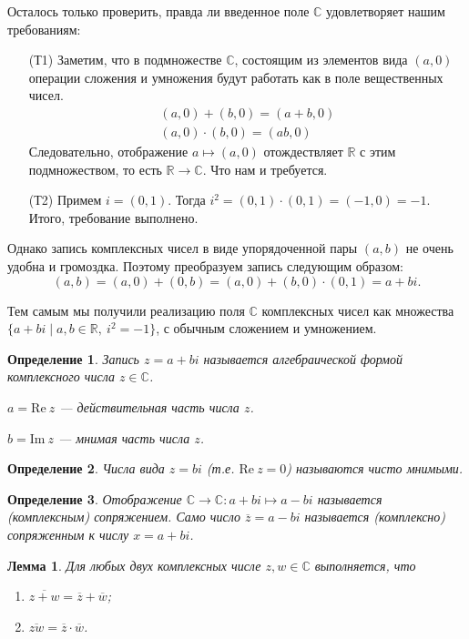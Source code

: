 \documentclass[a4paper,12pt]{article}
\newtheorem*{Def}{Определение}
\newtheorem*{Lemma}{Лемма}
\renewcommand{\Re}{\mathrm{Re\:}}
\renewcommand{\Im}{\mathrm{Im\:}}
\begin{document}
Осталось только проверить, правда ли введенное поле $\mathbb{C}$ удовлетворяет нашим требованиям:
\begin{itemize}
\item[(Т1)] Заметим, что в подмножестве $\mathbb{C}$, состоящим из элементов вида $(a, 0)$ операции сложения и умножения будут работать как в поле вещественных чисел.
\begin{gather*}
(a, 0) + (b, 0) = (a + b, 0) \\
(a, 0) \cdot (b, 0) = (ab, 0)
\end{gather*} 
Следовательно, отображение $a \mapsto (a, 0)$ отождествляет $\mathbb{R}$ с этим подмножеством, то есть $\mathbb{R} \rightarrow \mathbb{C}$. Что нам и требуется.
\item[(Т2)] Примем $i = (0, 1)$. Тогда $i^2 = (0, 1) \cdot (0, 1) = (-1, 0) = -1$. Итого, требование выполнено.
\end{itemize}

Однако запись комплексных чисел в виде упорядоченной пары $(a, b)$ не очень удобна и громоздка. Поэтому преобразуем запись следующим образом:
\[
(a, b) = (a, 0) + (0, b) = (a, 0) + (b, 0) \cdot (0, 1) = a + bi.
\]

Тем самым мы получили реализацию поля $\mathbb{C}$ комплексных чисел как множества \\ $\{a + bi \mid a, b \in \mathbb{R},\ i^2 = -1\}$, с обычным сложением и умножением.

\begin{Def}
Запись $z = a + bi$ называется алгебраической формой комплексного числа $z \in \mathbb{C}$.


$a = \Re z$ — действительная часть числа $z$.


$b = \Im z$ — мнимая часть числа $z$.
\end{Def}

\begin{Def}
Числа вида $z = bi$ (т.е. $\Re z = 0$) называются чисто мнимыми.
\end{Def}

\begin{Def}
Отображение $\mathbb{C} \rightarrow \mathbb{C} : a + bi \mapsto a - bi$ называется (комплексным) сопряжением. Само число $\overline{z} = a - bi$ называется (комплексно) сопряженным к числу $x = a + bi$. 
\end{Def}

\begin{Lemma}
Для любых двух комплексных числе $z, w \in \mathbb{C}$ выполняется, что
\begin{enumerate}
\item $\overline{z + w} = \overline{z} + \overline{w}$;
\item $\overline{zw} = \overline{z} \cdot \overline{w}$.
\end{enumerate}
\end{Lemma}
\end{document}

